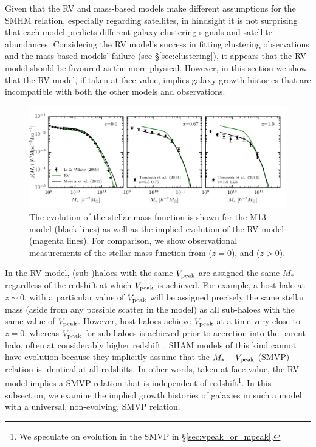 \documentclass[useAMS,fleqn,usenatbib]{mnras}
\begin{document}
Given that the RV and mass-based models make different assumptions for the SMHM relation, especially regarding satellites, in hindsight it is not surprising that each model predicts different galaxy clustering signals and satellite abundances.   Considering the RV model's success in fitting clustering observations and the mass-based models' failure (see \S \ref{sec:clustering}), it appears that the RV model should be favoured as the more physical.  However, in this section we show that the RV model, if taken at face value, implies galaxy growth histories that are incompatible with both the other models and observations.

\begin{figure}
    \includegraphics[width=\textwidth]{figures/stellar_mass_function_evolution.pdf}
    \caption{The evolution of the stellar mass function is shown for the M13 model (black lines) as well as the implied evolution of the RV model (magenta lines). For comparison, we show observational measurements of the stellar mass function from  \citet{Li:2009kh} ($z=0$), and \citet{Tomczak2014:db} ($z>0$).}
    \label{fig:stellar_mass_function_evolution}
\end{figure}

In the RV model, (sub-)haloes with the same $V_{\rm peak}$ are assigned the same $M_*$ regardless of the redshift at which $V_{\rm peak}$ is achieved. For example, a host-halo at $z\sim 0$, with a particular value of $V_{\rm peak}$ will be assigned precisely the same stellar mass (aside from any possible scatter in the model) as all sub-haloes with the same value of $V_{\rm peak}$. However, host-haloes achieve $V_{\rm peak}$ at a time very close to $z=0$, whereas $V_{\rm peak}$ for sub-haloes is achieved prior to accretion into the parent halo, often at considerably higher redshift \citep{Reddick:2013gi, Behroozi:2014bg, Mao:2017ww}. SHAM models of this kind cannot have evolution because they implicitly assume that the $M_*-V_{\rm peak}$ (SMVP) relation is identical at all redshifts. In other words, taken at face value, the RV model implies a SMVP relation that is independent of redshift\footnote{We speculate on evolution in the SMVP in \S \ref{sec:vpeak_or_mpeak}.}. In this subsection, we examine the implied growth histories of galaxies in such a model with a universal, non-evolving, SMVP relation. 
\end{document}
